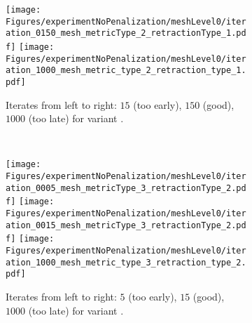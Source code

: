 \begin{figure}[htp]
	\begin{center}
		\captionsetup[subfigure]{labelformat=empty}
		\begin{subfigure}{0.9\textwidth}
			\begin{center}
				\quad
				\texttt{[image: Figures/experimentNoPenalization/meshLevel0/iteration\_0150\_mesh\_metricType\_2\_retractionType\_1.pdf]}
				\quad
				\texttt{[image: Figures/experimentNoPenalization/meshLevel0/iteration\_1000\_mesh\_metric\_type\_2\_retraction\_type\_1.pdf]}
				\caption{Iterates from left to right: $15$ (too early), $150$ (good), $1000$ (too late) for variant \ElasEuc.}
				\label{fig:experimentNoPenalizationvariant2}
			\end{center}
		\end{subfigure}
		\\
		\begin{subfigure}{0.9\textwidth}
			\begin{center}
				\texttt{[image: Figures/experimentNoPenalization/meshLevel0/iteration\_0005\_mesh\_metricType\_3\_retractionType\_2.pdf]}
				\quad
				\texttt{[image: Figures/experimentNoPenalization/meshLevel0/iteration\_0015\_mesh\_metricType\_3\_retractionType\_2.pdf]}
				\quad
				\texttt{[image: Figures/experimentNoPenalization/meshLevel0/iteration\_1000\_mesh\_metric\_type\_3\_retraction\_type\_2.pdf]}
				\caption{Iterates from left to right: $5$ (too early), $15$ (good), $1000$ (too late) for variant \CompComp.}
				\label{fig:experimentNoPenalizationvariant4}
			\end{center}
		\end{subfigure}
		\\
		\begin{subfigure}{0.45\textwidth}
			\begin{center}
				\pgfplotsset{compat=1.14, width=\textwidth}
\end{center}
\end{subfigure}
\end{center}
\end{figure}
